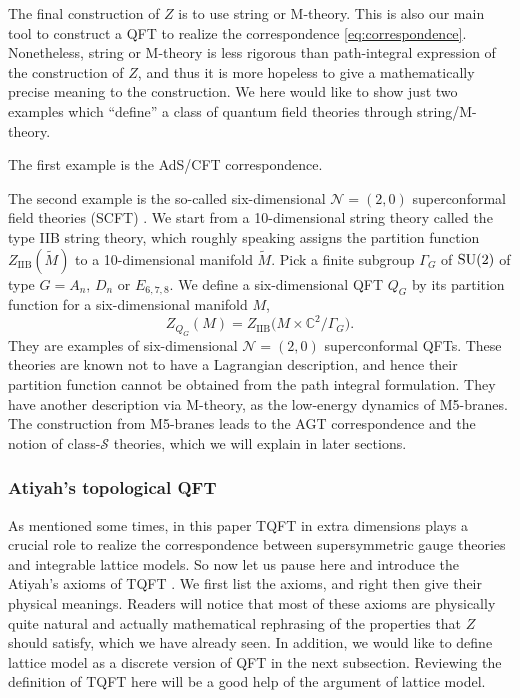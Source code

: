 The final construction of $Z$ is to use string or M-theory. This
is also our main tool to construct a QFT to realize the correspondence
\eqref{eq:correspondence}. Nonetheless, string or M-theory
is less rigorous than path-integral expression of the construction
of $Z$, and thus it is more hopeless to give a mathematically precise
meaning to the construction. We here would like to show just two examples
which ``define'' a class of quantum field theories through string/M-theory.

The first example is the AdS/CFT correspondence.

The second example is the so-called six-dimensional $\mathcal{N}=(2,0)$
superconformal field theories (SCFT) \cite{Witten:1995zh}. We start from a 10-dimensional string theory called the
type IIB string theory, which roughly speaking assigns the partition
function $Z_{\mathrm{IIB}}(\tilde{M})$ to a 10-dimensional
manifold $\tilde{M}$. Pick a finite subgroup $\Gamma_{G}$ of $\mathrm{SU}(2)$
of type $G=A_{n},\,D_{n}$ or $E_{6,7,8}$. We define a six-dimensional
QFT $Q_{G}$ by its partition function for a six-dimensional manifold
$M$,
\begin{equation}
Z_{Q_{G}}(M)  =  Z_{\mathrm{IIB}}\big(M\times\mathbb{C}^{2}/\Gamma_{G}\big).
\end{equation}
 They are examples of six-dimensional $\mathcal{N}=(2,0)$
superconformal QFTs. These theories are known not to have a Lagrangian
description, and hence their partition function cannot be obtained from
the path integral formulation. They have another description via M-theory,
as the low-energy dynamics of M5-branes. The construction from M5-branes
leads to the AGT correspondence and the notion of class-$\mathcal{S}$
theories, which we will explain in later sections.






\subsubsection{Atiyah's topological QFT}
\label{sec:Atiyah_TQFT}

As mentioned some times, in this paper TQFT in extra dimensions
plays a crucial role to realize the correspondence between supersymmetric
gauge theories and integrable lattice models. So now let us pause
here and introduce the Atiyah's axioms of TQFT \cite{Atiyah:1989vu}. We first list the
axioms, and right then give their physical meanings. Readers will
notice that most of these axioms are physically quite natural and
actually mathematical rephrasing of the properties that $Z$ should
satisfy, which we have already seen. In addition, we would like to
define lattice model as a discrete version of QFT in the next subsection.
Reviewing the definition of TQFT here will be a good help
of the argument of lattice model.


